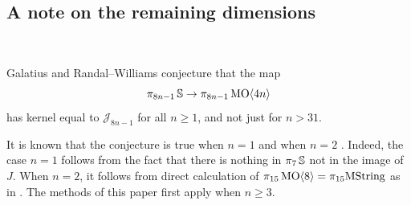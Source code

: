 \subsection{A note on the remaining dimensions}
\label{sec:open-problems}\ 

Galatius and Randal--Williams conjecture \cite[Conjecture A]{GRAbelianQuotients} that the map
$$\pi_{8n-1} \operatorname{\mathbb{S}} \to \pi_{8n-1} \operatorname{\mathrm{MO}} \langle 4n \rangle$$
has kernel equal to $\mathcal{J}_{8n-1}$ for all $n \ge 1$, and not just for $n >31$.

It is known that the conjecture is true when $n=1$ and when $n=2$ \cite[p. 13]{GRAbelianQuotients}.  Indeed, the case $n=1$ follows from the fact that there is nothing in $\pi_7 \operatorname{\mathbb{S}}$ not in the image of $J$.  When $n=2$, it follows from direct calculation of $\pi_{15} \operatorname{\mathrm{MO}} \langle 8 \rangle=\pi_{15} \mathrm{MString}$ as in \cite{GiambalvoO8,GiambalvoO8corrected}.  The methods of this paper first apply when $n \ge 3$.

